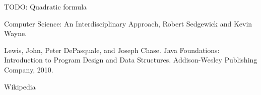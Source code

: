 \exercisesection

\begin{exercise}
TODO: Quadratic formula
\end{exercise}


Computer Science: An Interdisciplinary Approach, Robert Sedgewick and Kevin Wayne.

Lewis, John, Peter DePasquale, and Joseph Chase. Java Foundations: Introduction to Program Design and Data Structures. Addison-Wesley Publishing Company, 2010.

Wikipedia